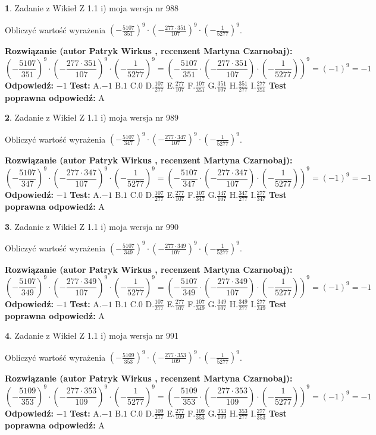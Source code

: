 \documentclass[12pt, a4paper]{article}
\theoremstyle{definition} %
\newtheorem{zad}{}
\newcommand{\zadStart}[1]{\begin{zad}#1\newline}
\newcommand{\zadStop}{\end{zad}}
\newcommand{\rozwStart}[2]{\noindent \textbf{Rozwiązanie (autor #1 , recenzent #2): }\newline}
\newcommand{\rozwStop}{\newline}
\newcommand{\odpStart}{\noindent \textbf{Odpowiedź:}\newline}
\newcommand{\odpStop}{\newline}
\newcommand{\testStart}{\noindent \textbf{Test:}\newline}
\newcommand{\testStop}{\newline}
\newcommand{\kluczStart}{\noindent \textbf{Test poprawna odpowiedź:}\newline}
\newcommand{\kluczStop}{\newline}
\begin{document}
\zadStart{Zadanie z Wikieł Z 1.1 i) moja wersja nr 988}

Obliczyć wartość wyrażenia $(-\frac{5107}{351})^{9} \cdot (-\frac{277 \cdot 351}{107})^{9} \cdot (-\frac{1}{5277})^{9}$.
\zadStop
\rozwStart{Patryk Wirkus}{Martyna Czarnobaj}
$$(-\frac{5107}{351})^{9} \cdot (-\frac{277 \cdot 351}{107})^{9} \cdot (-\frac{1}{5277})^{9} = (-\frac{5107}{351} \cdot (-\frac{277 \cdot 351}{107}) \cdot (-\frac{1}{5277}))^{9} = (-1)^{9} = -1$$
\rozwStop
\odpStart
$-1$
\odpStop
\testStart
A.$-1$ B.$1$ C.$0$ D.$\frac{107}{277}$ E.$\frac{277}{107}$
F.$\frac{107}{351}$ G.$\frac{351}{107}$
H.$\frac{351}{277}$
I.$\frac{277}{351}$
\testStop
\kluczStart
A
\kluczStop



\zadStart{Zadanie z Wikieł Z 1.1 i) moja wersja nr 989}

Obliczyć wartość wyrażenia $(-\frac{5107}{347})^{9} \cdot (-\frac{277 \cdot 347}{107})^{9} \cdot (-\frac{1}{5277})^{9}$.
\zadStop
\rozwStart{Patryk Wirkus}{Martyna Czarnobaj}
$$(-\frac{5107}{347})^{9} \cdot (-\frac{277 \cdot 347}{107})^{9} \cdot (-\frac{1}{5277})^{9} = (-\frac{5107}{347} \cdot (-\frac{277 \cdot 347}{107}) \cdot (-\frac{1}{5277}))^{9} = (-1)^{9} = -1$$
\rozwStop
\odpStart
$-1$
\odpStop
\testStart
A.$-1$ B.$1$ C.$0$ D.$\frac{107}{277}$ E.$\frac{277}{107}$
F.$\frac{107}{347}$ G.$\frac{347}{107}$
H.$\frac{347}{277}$
I.$\frac{277}{347}$
\testStop
\kluczStart
A
\kluczStop



\zadStart{Zadanie z Wikieł Z 1.1 i) moja wersja nr 990}

Obliczyć wartość wyrażenia $(-\frac{5107}{349})^{9} \cdot (-\frac{277 \cdot 349}{107})^{9} \cdot (-\frac{1}{5277})^{9}$.
\zadStop
\rozwStart{Patryk Wirkus}{Martyna Czarnobaj}
$$(-\frac{5107}{349})^{9} \cdot (-\frac{277 \cdot 349}{107})^{9} \cdot (-\frac{1}{5277})^{9} = (-\frac{5107}{349} \cdot (-\frac{277 \cdot 349}{107}) \cdot (-\frac{1}{5277}))^{9} = (-1)^{9} = -1$$
\rozwStop
\odpStart
$-1$
\odpStop
\testStart
A.$-1$ B.$1$ C.$0$ D.$\frac{107}{277}$ E.$\frac{277}{107}$
F.$\frac{107}{349}$ G.$\frac{349}{107}$
H.$\frac{349}{277}$
I.$\frac{277}{349}$
\testStop
\kluczStart
A
\kluczStop



\zadStart{Zadanie z Wikieł Z 1.1 i) moja wersja nr 991}

Obliczyć wartość wyrażenia $(-\frac{5109}{353})^{9} \cdot (-\frac{277 \cdot 353}{109})^{9} \cdot (-\frac{1}{5277})^{9}$.
\zadStop
\rozwStart{Patryk Wirkus}{Martyna Czarnobaj}
$$(-\frac{5109}{353})^{9} \cdot (-\frac{277 \cdot 353}{109})^{9} \cdot (-\frac{1}{5277})^{9} = (-\frac{5109}{353} \cdot (-\frac{277 \cdot 353}{109}) \cdot (-\frac{1}{5277}))^{9} = (-1)^{9} = -1$$
\rozwStop
\odpStart
$-1$
\odpStop
\testStart
A.$-1$ B.$1$ C.$0$ D.$\frac{109}{277}$ E.$\frac{277}{109}$
F.$\frac{109}{353}$ G.$\frac{353}{109}$
H.$\frac{353}{277}$
I.$\frac{277}{353}$
\testStop
\kluczStart
A
\kluczStop
\end{document}
